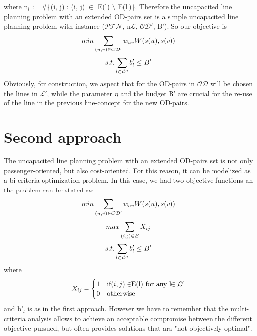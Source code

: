 \documentclass[
  twoside,
  11pt, a4paper,
  footinclude=true,
  headinclude=true,
  cleardoublepage=empty
]{scrbook}
\theoremstyle{definition}
\begin{document}
where n$_l$ := \#\{(i, j) : (i, j) $\in$ E(l) $\setminus$ E(l')\}. \newline
Therefore the uncapacited line planning problem with an extended OD-pairs set is a simple uncapacited line planning problem with instance ($\mathcal{PTN}$, n$\mathcal{L}$, $\mathcal{OD'}$, B'). So our objective is 
\begin{equation} \notag
min \sum_{(u,v)\in\mathcal{OD'}} w_{uv}W(s(u), s(v))
\end{equation}
\begin{equation} \notag
s.t. \sum_{l\in\mathcal{L''}} b'_l \le B'
\end{equation}
Obviously, for construction, we aspect that for the OD-pairs in $\mathcal{OD}$ will be chosen the lines in $\mathcal{L'}$, while the parameter $\eta$ and the budget B' are crucial for the re-use of the line in the previous line-concept  for the new OD-pairs.
\section{Second approach} 
The uncapacited line planning problem with an extended OD-pairs set is not only passenger-oriented, but also cost-oriented. For this reason, it can be modelized as a bi-criteria optimization problem. \newline
In this case, we had two objective functions an the problem can be stated as:
\begin{equation} \notag
min \sum_{(u,v)\in\mathcal{OD'}} w_{uv}W(s(u), s(v))
\end{equation}
\begin{equation} \notag
max \sum_{(i,j)\in E} X_{ij}
\end{equation}
\begin{equation} \notag
s.t. \sum_{l\in\mathcal{L''}} b'_l \le B'
\end{equation}
where 
\[X_{ij}=
\begin{cases}
1 & $if$ (i, j) \in $E(l) for any l$ \in \mathcal{L'} \\
0 & $otherwise$
\end{cases}
\]
and b'$_l$ is as in the first approach. \newline
However we have to remember that the multi-criteria analysis allows to achieve an acceptable compromise between the different objective pursued, but often provides solutions that ara "not objectively optimal".

{}
\printbibliography
\end{document}
